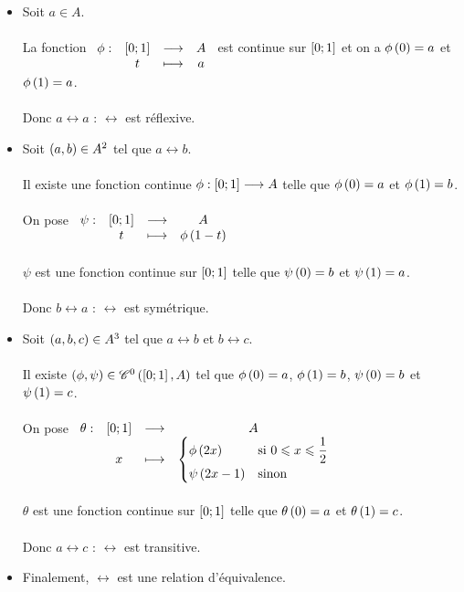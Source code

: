 \begin{dem}
\begin{itemize}
    \item Soit \(a\in A\). \\\\ La fonction \(\begin{array}[t]{cccc}\phi : & \left[0;1\right] & \longrightarrow & A \\ & t & \longmapsto & a\end{array}\) est continue sur \(\left[0;1\right]\) et on a \(\phi\left(0\right)=a\) et \(\phi\left(1\right)=a\). \\\\ Donc \(a\rel a\) : \(\rel\) est réflexive. \\
    \item Soit \(\left(a,b\right)\in A^2\) tel que \(a\rel b\). \\\\ Il existe une fonction continue \(\phi:\left[0;1\right]\longrightarrow A\) telle que \(\phi\left(0\right)=a\) et \(\phi\left(1\right)=b\). \\\\ On pose \(\begin{array}[t]{cccc}\psi : & \left[0;1\right] & \longrightarrow & A \\ & t & \longmapsto & \phi\left(1-t\right)\end{array}\) \\\\ \(\psi\) est une fonction continue sur \(\left[0;1\right]\) telle que \(\psi\left(0\right)=b\) et \(\psi\left(1\right)=a\). \\\\ Donc \(b\rel a\) : \(\rel\) est symétrique. \\
    \item Soit \(\left(a,b,c\right)\in A^3\) tel que \(a\rel b\) et \(b\rel c\). \\\\ Il existe \(\left(\phi,\psi\right)\in\mathscr{C}^{0}\left(\left[0;1\right],A\right)\) tel que \(\phi\left(0\right)=a\), \(\phi\left(1\right)=b\), \(\psi\left(0\right)=b\) et \(\psi\left(1\right)=c\). \\\\ On pose \(\begin{array}[t]{cccc}\theta : & \left[0;1\right] & \longrightarrow & A \\ & x & \longmapsto & \begin{dcases}\phi\left(2x\right) &\text{si }0\leqslant x\leqslant\dfrac{1}{2} \\ \psi\left(2x-1\right) &\text{sinon}\end{dcases}\end{array}\) \\\\ \(\theta\) est une fonction continue sur \(\left[0;1\right]\) telle que \(\theta\left(0\right)=a\) et \(\theta\left(1\right)=c\). \\\\ Donc \(a\rel c\) : \(\rel\) est transitive. \\
    \item Finalement, \(\rel\) est une relation d'équivalence.
\end{itemize}
\end{dem}

